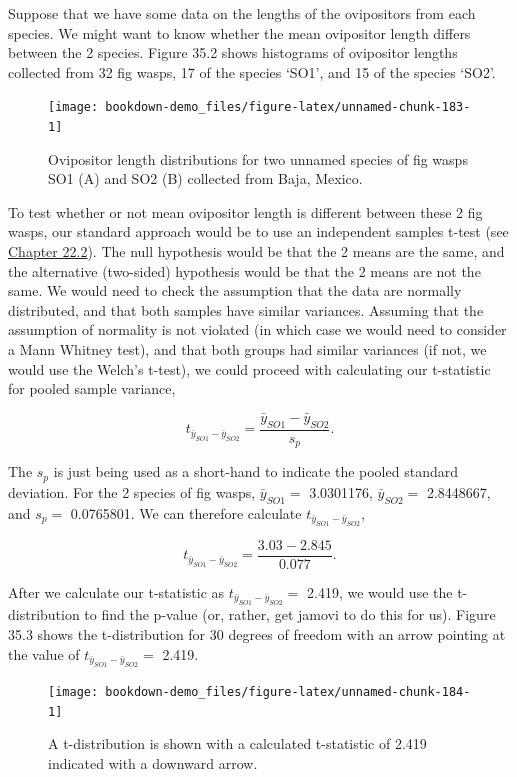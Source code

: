 \documentclass[
]{scrbook}
\begin{document}
Suppose that we have some data on the lengths of the ovipositors from each species.
We might want to know whether the mean ovipositor length differs between the 2 species. Figure 35.2 shows histograms of ovipositor lengths collected from 32 fig wasps, 17 of the species `SO1', and 15 of the species `SO2'.

\begin{figure}
\texttt{[image: bookdown-demo\_files/figure-latex/unnamed-chunk-183-1]} \caption{Ovipositor length distributions for two unnamed species of fig wasps SO1 (A) and SO2 (B) collected from Baja, Mexico.}\label{fig:unnamed-chunk-183}
\end{figure}

To test whether or not mean ovipositor length is different between these 2 fig wasps, our standard approach would be to use an independent samples t-test (see \protect\hyperlink{independent-samples-t-test}{Chapter 22.2}).
The null hypothesis would be that the 2 means are the same, and the alternative (two-sided) hypothesis would be that the 2 means are not the same.
We would need to check the assumption that the data are normally distributed, and that both samples have similar variances.
Assuming that the assumption of normality is not violated (in which case we would need to consider a Mann Whitney test), and that both groups had similar variances (if not, we would use the Welch's t-test), we could proceed with calculating our t-statistic for pooled sample variance,

\[t_{\bar{y}_{SO1} - \bar{y}_{SO2}} = \frac{\bar{y}_{SO1} - \bar{y}_{SO2}}{s_{p}}.\]

The \(s_{p}\) is just being used as a short-hand to indicate the pooled standard deviation.
For the 2 species of fig wasps, \(\bar{y}_{SO1} =\) 3.0301176, \(\bar{y}_{SO2} =\) 2.8448667, and \(s_{p} =\) 0.0765801.
We can therefore calculate \(t_{\bar{y}_{SO1} - \bar{y}_{SO2}}\),

\[t_{\bar{y}_{SO1} - \bar{y}_{SO2}} = \frac{3.03 - 2.845}{0.077}.\]

After we calculate our t-statistic as \(t_{\bar{y}_{SO1} - \bar{y}_{SO2}} =\) 2.419, we would use the t-distribution to find the p-value (or, rather, get jamovi to do this for us).
Figure 35.3 shows the t-distribution for 30 degrees of freedom with an arrow pointing at the value of \(t_{\bar{y}_{SO1} - \bar{y}_{SO2}} =\) 2.419.

\begin{figure}
\texttt{[image: bookdown-demo\_files/figure-latex/unnamed-chunk-184-1]} \caption{A t-distribution is shown with a calculated t-statistic of 2.419 indicated with a downward arrow.}\label{fig:unnamed-chunk-184}
\end{figure}
\end{document}
